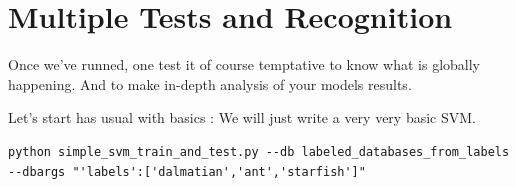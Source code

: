 \documentclass{report}
\begin{document}
\section{Multiple Tests and Recognition}
Once we've runned, one test it of course temptative to know what is globally happening.
And to make in-depth analysis of your models results.



Let's start has usual with basics :
We will just write a very very basic SVM.





\begin{lstlisting}
python simple_svm_train_and_test.py --db labeled_databases_from_labels --dbargs "'labels':['dalmatian','ant','starfish']"   

\end{lstlisting}
\end{document}
